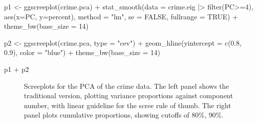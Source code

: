 \documentclass[
  letterpaper,
  10pt,
  krantz2]{krantz}
\makeatletter
\newenvironment{Shaded}{\begin{snugshade}}{\end{snugshade}}
\newcommand{\AttributeTok}[1]{\textcolor[rgb]{0.40,0.45,0.13}{#1}}
\newcommand{\ConstantTok}[1]{\textcolor[rgb]{0.56,0.35,0.01}{#1}}
\newcommand{\DecValTok}[1]{\textcolor[rgb]{0.68,0.00,0.00}{#1}}
\newcommand{\FloatTok}[1]{\textcolor[rgb]{0.68,0.00,0.00}{#1}}
\newcommand{\FunctionTok}[1]{\textcolor[rgb]{0.28,0.35,0.67}{#1}}
\newcommand{\NormalTok}[1]{\textcolor[rgb]{0.00,0.23,0.31}{#1}}
\newcommand{\OtherTok}[1]{\textcolor[rgb]{0.00,0.23,0.31}{#1}}
\newcommand{\SpecialCharTok}[1]{\textcolor[rgb]{0.37,0.37,0.37}{#1}}
\newcommand{\StringTok}[1]{\textcolor[rgb]{0.13,0.47,0.30}{#1}}
\newenvironment{kframe}{%
  \medskip{}
  \setlength{\fboxsep}{.8em}
  \def\at@end@of@kframe{}%
  \ifinner\ifhmode%
  \def\at@end@of@kframe{\end{minipage}}%
  \begin{minipage}{\columnwidth}%
  \fi\fi%
  \def\FrameCommand##1{\hskip\@totalleftmargin \hskip-\fboxsep
  \colorbox{shadecolor}{##1}\hskip-\fboxsep
      \hskip-\linewidth \hskip-\@totalleftmargin \hskip\columnwidth}%
  \MakeFramed {\advance\hsize-\width
    \@totalleftmargin\z@ \linewidth\hsize
    \@setminipage}}%
{\par\unskip\endMakeFramed%
  \at@end@of@kframe}
\renewenvironment{Shaded}{\begin{kframe}}{\end{kframe}}
\makeatother
\begin{document}
\begin{Shaded}
\begin{Highlighting}[]
\NormalTok{p1 }\OtherTok{\textless{}{-}} \FunctionTok{ggscreeplot}\NormalTok{(crime.pca) }\SpecialCharTok{+}
  \FunctionTok{stat\_smooth}\NormalTok{(}\AttributeTok{data =}\NormalTok{ crime.eig }\SpecialCharTok{|\textgreater{}} \FunctionTok{filter}\NormalTok{(PC}\SpecialCharTok{\textgreater{}=}\DecValTok{4}\NormalTok{), }
              \FunctionTok{aes}\NormalTok{(}\AttributeTok{x=}\NormalTok{PC, }\AttributeTok{y=}\NormalTok{percent), }\AttributeTok{method =} \StringTok{"lm"}\NormalTok{, }
              \AttributeTok{se =} \ConstantTok{FALSE}\NormalTok{,}
              \AttributeTok{fullrange =} \ConstantTok{TRUE}\NormalTok{) }\SpecialCharTok{+}
  \FunctionTok{theme\_bw}\NormalTok{(}\AttributeTok{base\_size =} \DecValTok{14}\NormalTok{)}

\NormalTok{p2 }\OtherTok{\textless{}{-}} \FunctionTok{ggscreeplot}\NormalTok{(crime.pca, }\AttributeTok{type =} \StringTok{"cev"}\NormalTok{) }\SpecialCharTok{+}
  \FunctionTok{geom\_hline}\NormalTok{(}\AttributeTok{yintercept =} \FunctionTok{c}\NormalTok{(}\FloatTok{0.8}\NormalTok{, }\FloatTok{0.9}\NormalTok{), }\AttributeTok{color =} \StringTok{"blue"}\NormalTok{) }\SpecialCharTok{+}
  \FunctionTok{theme\_bw}\NormalTok{(}\AttributeTok{base\_size =} \DecValTok{14}\NormalTok{)}

\NormalTok{p1 }\SpecialCharTok{+}\NormalTok{ p2}
\end{Highlighting}
\end{Shaded}

\begin{figure}[H]


\caption{\label{fig-crime-ggscreeplot}Screeplots for the PCA of the
crime data. The left panel shows the traditional version, plotting
variance proportions against component number, with linear guideline for
the scree rule of thumb. The right panel plots cumulative proportions,
showing cutoffs of 80\%, 90\%.}

\end{figure}%
\end{document}
